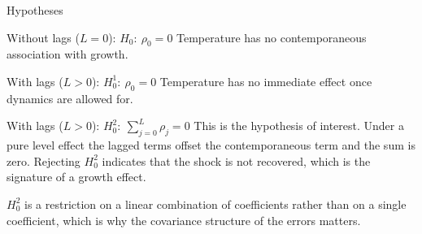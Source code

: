 \documentclass[aspectratio=169,10pt]{beamer}
\begin{document}
\begin{frame}{Hypotheses}
  \vfill
  \begin{block}{Without lags ($L=0$): \quad $H_0: \ \rho_0 = 0$}
    \small Temperature has no contemporaneous association with growth.
  \end{block}
  \vspace{2pt}
  \begin{block}{With lags ($L>0$): \quad $H_0^{1}: \ \rho_0 = 0$}
    \small Temperature has no immediate effect once dynamics are allowed for.
  \end{block}
  \vspace{2pt}
  \begin{block}{With lags ($L>0$): \quad $H_0^{2}: \ \sum_{j=0}^{L}\rho_j = 0$}
    \small This is the hypothesis of interest. Under a pure level effect the lagged
    terms offset the contemporaneous term and the sum is zero. Rejecting $H_0^2$
    indicates that the shock is not recovered, which is the signature of a growth
    effect.
  \end{block}
  \vfill
  \centering\small
  $H_0^2$ is a restriction on a linear combination of coefficients rather than on a
  single coefficient, which is why the covariance structure of the errors matters.
\end{frame}
\end{document}
